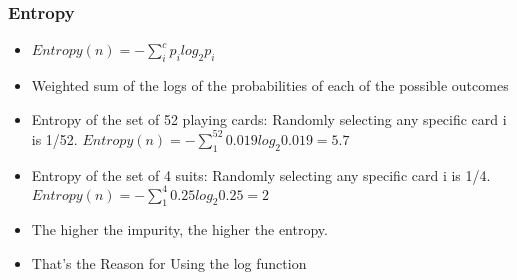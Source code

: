 \begin{frame}[fragile]\frametitle{Entropy}
\begin{itemize}

\item $Entropy(n) = - \sum_i^c p_i log_2 p_i$
\item Weighted sum of the logs of the probabilities of each of the possible outcomes
\item Entropy of the set of 52 playing cards: Randomly selecting any specific card i is 1/52. $Entropy(n) = - \sum_1^{52} 0.019 log_2 0.019 = 5.7$
\item Entropy of the set of 4 suits: Randomly selecting any specific card i is 1/4. $Entropy(n) = - \sum_1^{4} 0.25 log_2 0.25 = 2$
\item The higher the impurity, the higher the entropy.
\item That's the Reason for Using the log function
\end{itemize}
\end{frame}





